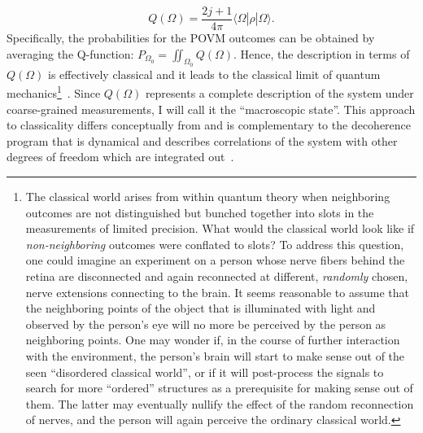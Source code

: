 \documentclass[12pt,a4]{article}
\begin{document}
\begin{equation}
Q(\Omega) = \frac{2j+1}{4\pi} \langle\Omega|\hat{\rho}|\Omega\rangle.
\end{equation}
Specifically, the probabilities for the POVM outcomes can be obtained by averaging the Q-function: $P_{\Omega_0} = \iint_{\Omega_0} Q(\Omega)$. Hence, the description in terms of $Q(\Omega)$ is effectively classical and it leads to the classical limit of quantum mechanics\footnote{The classical world arises from within quantum theory when neighboring outcomes are not distinguished but bunched together into slots in the measurements of limited precision. What would the classical world look like if {\it non-neighboring} outcomes were conflated to slots? To address this question, one could imagine an experiment on a person whose nerve fibers behind the retina are disconnected and again reconnected at different, {\it randomly} chosen, nerve extensions connecting to the brain. It seems reasonable to assume that the neighboring points of the object that is illuminated with light and observed by the person's eye will no more be perceived by the person as neighboring points. One may wonder if, in the course of further interaction with the environment, the person's brain will start to make sense out of the seen ``disordered classical world'', or if it will post-process the signals to search for more ``ordered'' structures as a prerequisite for making sense out of them. The latter may eventually nullify the effect of the random reconnection of nerves, and the person will again perceive the ordinary classical world.}~\cite{kofler}. Since $Q(\Omega)$ represents a complete description of the system under coarse-grained measurements, I will call it the ``macroscopic state''. This approach to classicality differs conceptually from and is complementary to the decoherence program that is dynamical and describes correlations of the system with other degrees of freedom which are integrated out~\cite{zurek}.
\end{document}
